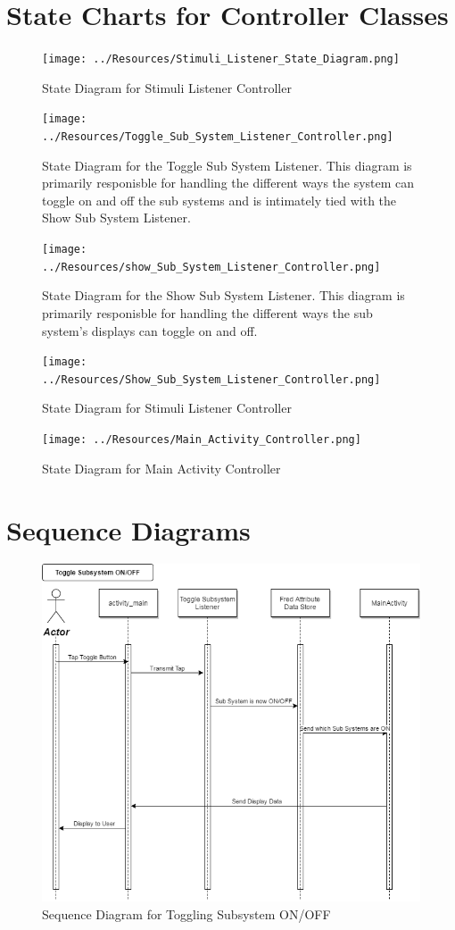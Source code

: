 \documentclass[]{article}
\begin{document}
\section{State Charts for Controller Classes}
\label{sec:state_charts_for_controller_classes}
\begin{figure}[H]
	\centering
	\texttt{[image: ../Resources/Stimuli\_Listener\_State\_Diagram.png]}
	\caption{State Diagram for Stimuli Listener Controller}
\end{figure}
\begin{figure}[H]
	\centering
	\texttt{[image: ../Resources/Toggle\_Sub\_System\_Listener\_Controller.png]}
	\caption{State Diagram for the Toggle Sub System Listener. This diagram is primarily responisble for handling the different ways the system can toggle on and off the sub systems and is intimately tied with the Show Sub System Listener. }
\end{figure}
\begin{figure}[H]
	\centering
	\texttt{[image: ../Resources/show\_Sub\_System\_Listener\_Controller.png]}
	\caption{State Diagram for the Show Sub System Listener. This diagram is primarily responisble for handling the different ways the sub system's displays can toggle on and off.}
\end{figure}
\begin{figure}[H]
	\centering
	\texttt{[image: ../Resources/Show\_Sub\_System\_Listener\_Controller.png]}
	\caption{State Diagram for Stimuli Listener Controller}
\end{figure}
\begin{figure}[H]
	\centering
	\texttt{[image: ../Resources/Main\_Activity\_Controller.png]}
	\caption{State Diagram for Main Activity Controller}
\end{figure}


\section{Sequence Diagrams}
\label{sec:sequence_diagrams}
\begin{figure}[H]
	\centering
	\includegraphics[width=0.7\linewidth]{../Resources/Toggle_Subsystem_Sequence_Diagram.png}
	\caption{Sequence Diagram for Toggling Subsystem ON/OFF}
\end{figure}
\end{document}
